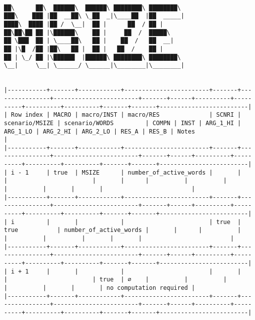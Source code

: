 \documentclass[varwidth=\maxdimen,margin=0.5cm,multi={verbatim}]{standalone}
\begin{document}
\begin{verbatim}

██\      ██\  ██████\  ██████\ ████████\ ████████\
███\    ███ |██  __██\ \_██  _|\____██  |██  _____|
████\  ████ |██ /  \__|  ██ |      ██  / ██ |
██\██\██ ██ |\██████\    ██ |     ██  /  █████\
██ \███  ██ | \____██\   ██ |    ██  /   ██  __|
██ |\█  /██ |██\   ██ |  ██ |   ██  /    ██ |
██ | \_/ ██ |\██████  |██████\ ████████\ ████████\
\__|     \__| \______/ \______|\________|\________|


|-----------+-------+------------+------------------------+-------+----------------+------------------------+-------+------+----------+----------+----------+----------+-------+-------+-------------------------|
| Row index | MACRO | macro/INST | macro/RES              | SCNRI | scenario/MSIZE | scenario/WORDS         | COMPN | INST | ARG_1_HI | ARG_1_LO | ARG_2_HI | ARG_2_LO | RES_A | RES_B | Notes                   |
|-----------+-------+------------+------------------------+-------+----------------+------------------------+-------+------+----------+----------+----------+----------+-------+-------+-------------------------|
| i - 1     | true  | MSIZE      | number_of_active_words |       |                |                        |       |      |          |          |          |          |       |       |                         |
|-----------+-------+------------+------------------------+-------+----------------+------------------------+-------+------+----------+----------+----------+----------+-------+-------+-------------------------|
| i         |       |            |                        | true  | true           | number_of_active_words |       |      |          |          |          |          |       |       |                         |
|-----------+-------+------------+------------------------+-------+----------------+------------------------+-------+------+----------+----------+----------+----------+-------+-------+-------------------------|
| i + 1     |       |            |                        |       |                |                        | true  | ∅    |          |          |          |          |       |       | no computation required |
|-----------+-------+------------+------------------------+-------+----------------+------------------------+-------+------+----------+----------+----------+----------+-------+-------+-------------------------|

\end{verbatim}
\end{document}
